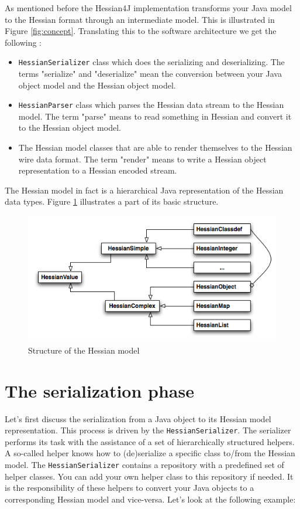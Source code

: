 \documentclass[a4paper]{article}
\begin{document}
As mentioned before the Hessian4J implementation transforms your Java model to the Hessian format through an intermediate model. This is illustrated in Figure \ref{fig:concept}. Translating this to the software architecture we get the following :

\begin{itemize}
	\item \lstinline$HessianSerializer$ class which does the serializing and deserializing. The terms "serialize" and "deserialize" mean the conversion between your Java object model and the Hessian object model.
	\item \lstinline$HessianParser$ class which parses the Hessian data stream to the Hessian model. The term "parse" means to read something in Hessian and convert it to the Hessian object model.
	\item The Hessian model classes that are able to render themselves to the Hessian wire data format. The term "render" means to write a Hessian object representation to a Hessian encoded stream.
\end{itemize}

The Hessian model in fact is a hierarchical Java representation of the Hessian data types. Figure \ref{fig:model} illustrates a part of its basic structure.

\smallskip
\begin{figure}[htp]
\centering
\includegraphics[scale=0.8]{model.png}
\caption{Structure of the Hessian model}\label{fig:model}
\end{figure}
\smallskip

\section{The serialization phase}

Let's first discuss the serialization from a Java object to its Hessian model representation. This process is driven by the \lstinline$HessianSerializer$. The serializer performs its task with the assistance of a set of hierarchically structured helpers. A so-called helper knows how to (de)serialize a specific class to/from the Hessian model. The \lstinline$HessianSerializer$ contains a repository with a predefined set of helper classes. You can add your own helper class to this repository if needed. It is the responsibility of these helpers to convert your Java objects to a corresponding Hessian model and vice-versa. Let's look at the following example:
\end{document}
